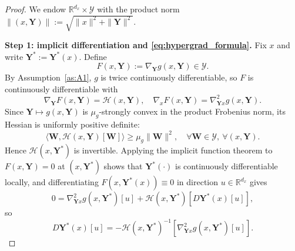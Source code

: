 \documentclass{pkumelon}
\theoremstyle{plain}
\newcommand{\R}{\mathbb{R}}
\begin{document}
\begin{proof}
We endow $\R^{d_x}\times\mathcal Y$ with the product norm $\|(x,\boldsymbol Y)\|:=\sqrt{\|x\|^2+\|\boldsymbol Y\|^2}$.

\textbf{Step 1: implicit differentiation and \eqref{eq:hypergrad_formula}. }
Fix $x$ and write $\boldsymbol Y^*:=\boldsymbol Y^*(x)$. Define
\begin{equation*}
F(x,\boldsymbol Y):=\nabla_{\boldsymbol Y}g(x,\boldsymbol Y)\in\mathcal Y.
\end{equation*}
By Assumption~\ref{as:A1}, $g$ is twice continuously differentiable, so $F$ is continuously differentiable with
\begin{equation*}
\nabla_{\boldsymbol Y}F(x,\boldsymbol Y)=\mathcal H(x,\boldsymbol Y), \quad \nabla_x F(x,\boldsymbol Y)=\nabla_{\boldsymbol Y x}^2 g(x,\boldsymbol Y).
\end{equation*}
Since $\boldsymbol Y\mapsto g(x,\boldsymbol Y)$ is $\mu_g$-strongly convex in the product Frobenius norm, its Hessian is uniformly positive definite:
\begin{equation}\label{eq:H_sc_product}
\langle \boldsymbol W,\mathcal H(x,\boldsymbol Y)[\boldsymbol W]\rangle
\ge \mu_g \|\boldsymbol W\|^2,
\quad
\forall \boldsymbol W\in\mathcal Y,\ \forall (x,\boldsymbol Y).
\end{equation}
Hence $\mathcal H(x,\boldsymbol Y^*)$ is invertible. Applying the implicit function theorem to $F(x,\boldsymbol Y)=0$ at $(x,\boldsymbol Y^*)$ shows that $\boldsymbol Y^*(\cdot)$ is continuously differentiable locally, and differentiating $F(x,\boldsymbol Y^*(x))\equiv 0$ in direction $u\in\R^{d_x}$ gives
\begin{equation*}
0=\nabla_{\boldsymbol Y x}^2 g(x,\boldsymbol Y^*)[u] +\mathcal H(x,\boldsymbol Y^*)[D\boldsymbol Y^*(x)[u]],
\end{equation*}
so
\begin{equation}\label{eq:DYstar_formula_product}
D\boldsymbol Y^*(x)[u]
=-\mathcal H(x,\boldsymbol Y^*)^{-1}[\nabla_{\boldsymbol Y x}^2 g(x,\boldsymbol Y^*)[u]].
\end{equation}


\end{proof}
\end{document}
